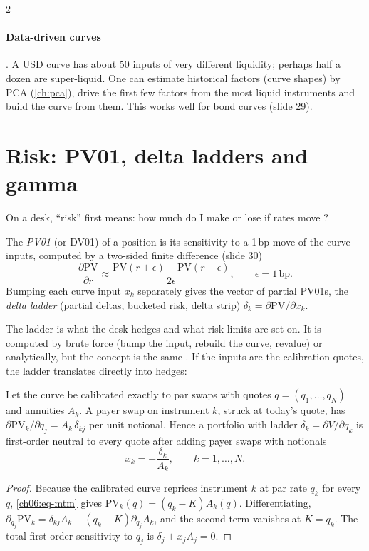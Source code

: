 \begin{paracol}{2}
\paragraph{Data-driven curves} . A USD curve has about 50 inputs of very different liquidity;
perhaps half a dozen are super-liquid. One can estimate historical factors (curve shapes) by PCA
(\cref{ch:pca}), drive the first few factors from the most liquid instruments and build the curve from them. This
works well for bond curves (slide 29).

\section{Risk: PV01, delta ladders and gamma}\label{ch06:sec-risk}
On a desk, ``risk'' first means: how much do I make or lose if rates move ?

\begin{definition}
The \emph{PV01} (or DV01) of a position is its sensitivity to a 1\,bp move of the curve inputs, computed by a
two-sided finite difference (slide 30)
\[
  \frac{\partial\mathrm{PV}}{\partial r}\approx\frac{\mathrm{PV}(r+\epsilon)-\mathrm{PV}(r-\epsilon)}{2\epsilon},
  \qquad \epsilon=1\,\text{bp}.
\]
Bumping each curve input $x_k$ separately gives the vector of partial PV01s, the \emph{delta ladder} (partial
deltas, bucketed risk, delta strip) $\delta_k=\partial\mathrm{PV}/\partial x_k$.
\end{definition}
The ladder is what the desk hedges and what risk limits are set on. It is computed by brute force (bump the input,
rebuild the curve, revalue) or analytically, but the concept is the same . If the inputs are the
calibration quotes, the ladder translates directly into hedges:

\begin{proposition}\label{ch06:prop-hedge}
Let the curve be calibrated exactly to par swaps with quotes $q=(q_1,\dots,q_N)$ and annuities $A_k$. A payer
swap on instrument $k$, struck at today's quote, has $\partial\mathrm{PV}_k/\partial q_j=A_k\,\delta_{kj}$ per unit
notional. Hence a portfolio with ladder $\delta_k=\partial V/\partial q_k$ is first-order neutral to every quote
after adding payer swaps with notionals
\[
  x_k=-\frac{\delta_k}{A_k},\qquad k=1,\dots,N .
\]
\end{proposition}
\begin{proof}
Because the calibrated curve reprices instrument $k$ at par rate $q_k$ for every $q$, \eqref{ch06:eq-mtm} gives
$\mathrm{PV}_k(q)=(q_k-K)A_k(q)$. Differentiating, $\partial_{q_j}\mathrm{PV}_k=\delta_{kj}A_k+(q_k-K)\partial_{q_j}A_k$,
and the second term vanishes at $K=q_k$. The total first-order sensitivity to $q_j$ is $\delta_j+x_jA_j=0$.
\end{proof}


\end{paracol}

